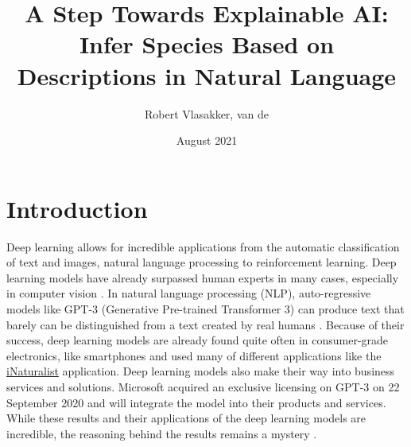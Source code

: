 \documentclass{article}
\title{A Step Towards Explainable AI: Infer Species Based on Descriptions in Natural Language}
\author{Robert Vlasakker, van de}
\date{August 2021}
\begin{document}
\graphicspath{ {./figures/} }

\maketitle


\section{Introduction}
Deep learning allows for incredible applications from the automatic classification of text and images, natural language processing to reinforcement learning.
Deep learning models have already surpassed human experts in many cases, especially in computer vision \autocite{he_delving_2015}.
In natural language processing (NLP), auto-regressive models like GPT-3 (Generative Pre-trained Transformer 3) can produce text that barely can be distinguished from a text created by real humans \autocite{brown_language_2020}.
Because of their success, deep learning models are already found quite often in consumer-grade electronics, like smartphones and used many of different applications like the \href{https://www.inaturalist.org/}{iNaturalist} application.
Deep learning models also make their way into business services and solutions.
Microsoft acquired an exclusive licensing on GPT-3 on 22 September 2020 and will integrate the model into their products and services.
While these results and their applications of the deep learning models are incredible, the reasoning behind the results remains a mystery \autocite{li_interpretable_2021, losch_interpretability_2019}.
\end{document}
